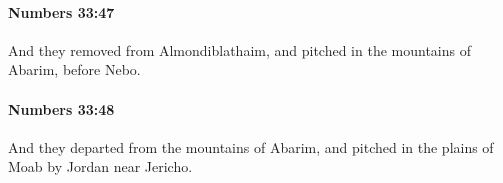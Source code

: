 		\paragraph{Numbers 33:47} %
			\label{NUMBERS-33-47}

			And they removed from Almondiblathaim, and pitched in the mountains of Abarim, before Nebo.


		\paragraph{Numbers 33:48} %
			\label{NUMBERS-33-48}

			And they departed from the mountains of Abarim, and pitched in the plains of Moab by Jordan near Jericho.


